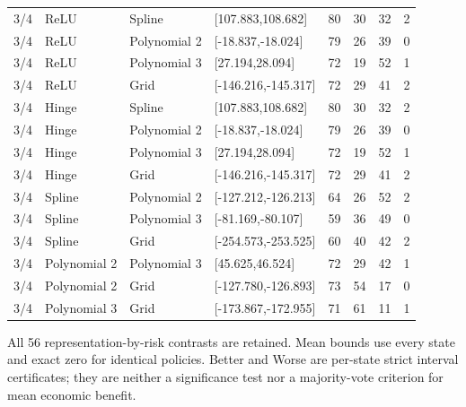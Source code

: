 \begin{longtable}{llllrrrr}
3/4 & ReLU & Spline & [107.883,108.682] & 80 & 30 & 32 & 2 \\
3/4 & ReLU & Polynomial 2 & [-18.837,-18.024] & 79 & 26 & 39 & 0 \\
3/4 & ReLU & Polynomial 3 & [27.194,28.094] & 72 & 19 & 52 & 1 \\
3/4 & ReLU & Grid & [-146.216,-145.317] & 72 & 29 & 41 & 2 \\
3/4 & Hinge & Spline & [107.883,108.682] & 80 & 30 & 32 & 2 \\
3/4 & Hinge & Polynomial 2 & [-18.837,-18.024] & 79 & 26 & 39 & 0 \\
3/4 & Hinge & Polynomial 3 & [27.194,28.094] & 72 & 19 & 52 & 1 \\
3/4 & Hinge & Grid & [-146.216,-145.317] & 72 & 29 & 41 & 2 \\
3/4 & Spline & Polynomial 2 & [-127.212,-126.213] & 64 & 26 & 52 & 2 \\
3/4 & Spline & Polynomial 3 & [-81.169,-80.107] & 59 & 36 & 49 & 0 \\
3/4 & Spline & Grid & [-254.573,-253.525] & 60 & 40 & 42 & 2 \\
3/4 & Polynomial 2 & Polynomial 3 & [45.625,46.524] & 72 & 29 & 42 & 1 \\
3/4 & Polynomial 2 & Grid & [-127.780,-126.893] & 73 & 54 & 17 & 0 \\
3/4 & Polynomial 3 & Grid & [-173.867,-172.955] & 71 & 61 & 11 & 1 \\
\end{longtable}
\noindent All 56 representation-by-risk contrasts are retained. Mean bounds use every state and exact zero for identical policies. Better and Worse are per-state strict interval certificates; they are neither a significance test nor a majority-vote criterion for mean economic benefit.
\endgroup
